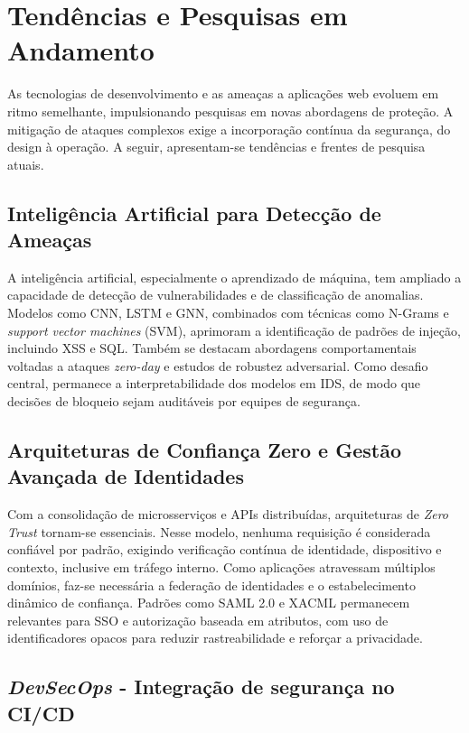 \section{
    Tendências e Pesquisas em Andamento
} \label{sec:tendencias}


As tecnologias de desenvolvimento e as ameaças a aplicações web evoluem em ritmo semelhante, impulsionando pesquisas em novas abordagens de proteção. A mitigação de ataques complexos exige a incorporação contínua da segurança, do design à operação. A seguir, apresentam-se tendências e frentes de pesquisa atuais.

\subsection{
    Inteligência Artificial para Detecção de Ameaças
}

A inteligência artificial, especialmente o aprendizado de máquina, tem ampliado a capacidade de detecção de vulnerabilidades e de classificação de anomalias. Modelos como CNN, LSTM e GNN, combinados com técnicas como N-Grams e \textit{support vector machines} (SVM), aprimoram a identificação de padrões de injeção, incluindo XSS e SQL. Também se destacam abordagens comportamentais voltadas a ataques \textit{zero-day} e estudos de robustez adversarial. Como desafio central, permanece a interpretabilidade dos modelos em IDS, de modo que decisões de bloqueio sejam auditáveis por equipes de segurança.

\subsection{
    Arquiteturas de Confiança Zero e Gestão Avançada de Identidades
}

Com a consolidação de microsserviços e APIs distribuídas, arquiteturas de \textit{Zero Trust} tornam-se essenciais. Nesse modelo, nenhuma requisição é considerada confiável por padrão, exigindo verificação contínua de identidade, dispositivo e contexto, inclusive em tráfego interno. Como aplicações atravessam múltiplos domínios, faz-se necessária a federação de identidades e o estabelecimento dinâmico de confiança. Padrões como SAML 2.0 e XACML permanecem relevantes para SSO e autorização baseada em atributos, com uso de identificadores opacos para reduzir rastreabilidade e reforçar a privacidade.

\subsection{
    \textit{DevSecOps} - Integração de segurança no CI/CD
}

